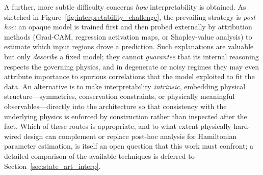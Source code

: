 \documentclass[letterpaper, 12, one column]{article}
\begin{document}
A further, more subtle difficulty concerns \emph{how} interpretability is obtained. As sketched in Figure~\ref{fig:interpretability_challenge}, the prevailing strategy is \emph{post hoc}: an opaque model is trained first and then probed externally by attribution methods (Grad-CAM, regression activation maps, or Shapley-value analysis) to estimate which input regions drove a prediction. Such explanations are valuable but only \emph{describe} a fixed model; they cannot \emph{guarantee} that its internal reasoning respects the governing physics, and in degenerate or noisy regimes they may even attribute importance to spurious correlations that the model exploited to fit the data. An alternative is to make interpretability \emph{intrinsic}, embedding physical structure—symmetries, conservation constraints, or physically meaningful observables—directly into the architecture so that consistency with the underlying physics is enforced by construction rather than inspected after the fact. Which of these routes is appropriate, and to what extent physically hard-wired design can complement or replace post-hoc analysis for Hamiltonian parameter estimation, is itself an open question that this work must confront; a detailed comparison of the available techniques is deferred to Section~\ref{sec:state_art_interp}.
\end{document}
